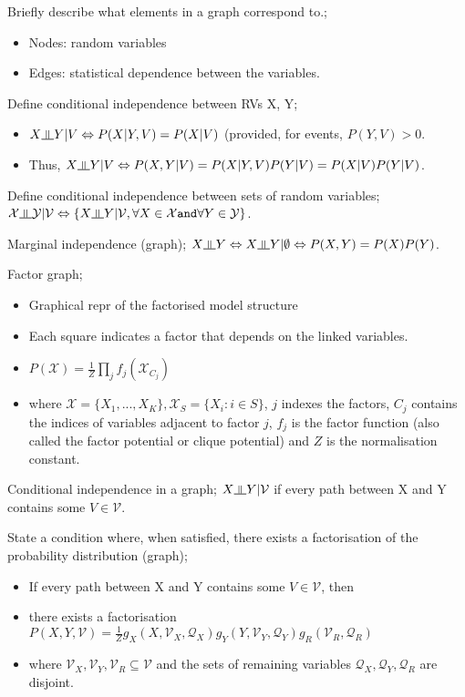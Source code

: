\documentclass{article}
\newcommand{\indep}{\rotatebox[origin=c]{90}{$\models$}}
\begin{document}
	
Briefly describe what elements in a graph correspond to.; \begin{itemize}
	\item Nodes: random variables
	\item Edges: statistical dependence between the variables.
\end{itemize}

Define conditional independence between RVs X, Y; 
\begin{itemize}
	\item $X\indep Y|V \Leftrightarrow P(X|Y, V) = P(X|V)$ (provided, for events, $P(Y,V)>0$.
	\item Thus, $X\indep Y|V \Leftrightarrow P(X,Y|V)=P(X|Y,V)P(Y|V)=P(X|V)P(Y|V)$.
\end{itemize}

Define conditional independence between sets of random variables; $\mathcal{X} \indep \mathcal{Y}|\mathcal{V} \Leftrightarrow \{X\indep Y | \mathcal{V}, \forall X \in \mathcal{X} \mathtt{ and }\forall Y \in \mathcal{Y}\}$.

Marginal independence (graph); $X\indep Y \Leftrightarrow X \indep Y | \emptyset \Leftrightarrow P(X,Y) = P(X)P(Y)$.

Factor graph; \begin{itemize}
	\item Graphical repr of the factorised model structure
	\item Each square indicates a factor that depends on the linked variables.
	\item $P(\mathcal{X})=\frac{1}{Z}\prod_j f_j(\mathcal{X}_{C_j})$
	\item where $\mathcal{X}=\{X_1,...,X_K\}, \mathcal{X}_S=\{X_i:i\in S\}$, $j$ indexes the factors, $C_j$ contains the indices of variables adjacent to factor $j$, $f_j$ is the factor function (also called the factor potential or clique potential) and $Z$ is the normalisation constant.
\end{itemize}

Conditional independence in a graph; $X\indep Y|\mathcal{V}$ if every path between X and Y contains some $V\in\mathcal{V}$.

State a condition where, when satisfied, there exists a factorisation of the probability distribution (graph); \begin{itemize}
	\item If every path between X and Y contains some $V\in\mathcal{V}$, then
	\item there exists a factorisation $P(X,Y,\mathcal{V})=\frac{1}{Z}g_X(X,\mathcal{V}_X, \mathcal{Q}_X)g_Y(Y,\mathcal{V}_Y, \mathcal{Q}_Y)g_R(\mathcal{V}_R, \mathcal{Q}_R)$
	\item where $\mathcal{V}_X, \mathcal{V}_Y, \mathcal{V}_R \subseteq \mathcal{V}$ and the sets of remaining variables $\mathcal{Q}_X,\mathcal{Q}_Y,\mathcal{Q}_R$ are disjoint.
\end{itemize}
\end{document}
